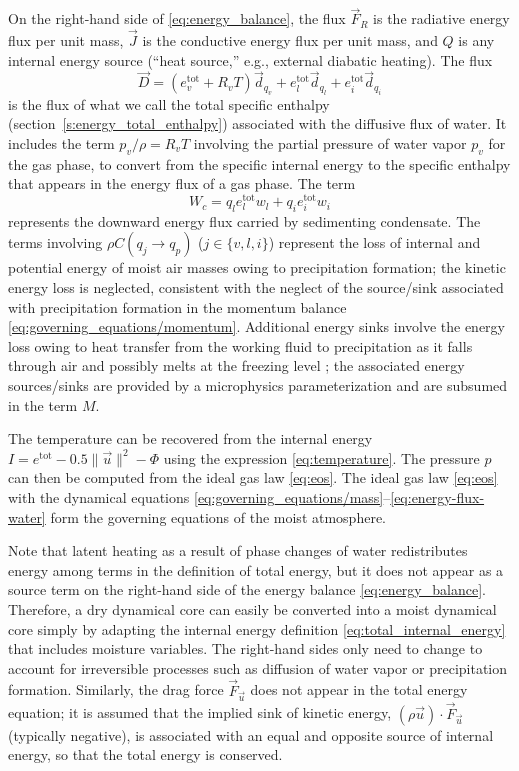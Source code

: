 \documentclass{report}
\begin{document}
On the right-hand side of \eqref{eq:energy_balance}, the flux $\vec{F}_R$ is the radiative energy flux per unit mass, $\vec{J}$ is the conductive energy flux per unit mass, and $Q$ is any internal energy source (``heat source,'' e.g., external diabatic heating). The flux 
\begin{equation}\label{eq:energy-flux-water}
\vec{D} = (e_v^{\mathrm{tot}} + R_v T) \vec{d}_{q_v} + e_l^{\mathrm{tot}} \vec{d}_{q_l} +  e_i^{\mathrm{tot}} \vec{d}_{q_i}
\end{equation}
is the flux of what we call the total specific enthalpy (section~\ref{s:energy_total_enthalpy}) associated with the diffusive flux of water. It includes the term $p_v/\rho = R_v T$ involving the partial pressure of water vapor $p_v$ for the gas phase, to convert from the specific internal energy to the specific enthalpy that appears in the energy flux of a gas phase. The term 
\begin{equation}
W_c = q_l e_l^{\mathrm{tot}} w_l + q_i e_i^{\mathrm{tot}} w_i
\end{equation}
represents the downward energy flux carried by sedimenting condensate. The terms involving $\rho C(q_j \rightarrow q_p)$ ($j \in \{ v, l, i \}$) represent the loss of internal and potential energy of moist air masses owing to precipitation formation; the kinetic energy loss is neglected, consistent with the neglect of the source/sink associated with precipitation formation in the momentum balance \eqref{eq:governing_equations/momentum}. Additional energy sinks involve the energy loss owing to heat transfer from the working fluid to precipitation as it falls through air and possibly melts at the freezing level \citep{Raymond13b}; the associated energy sources/sinks are provided by a microphysics parameterization and are subsumed in the term $M$.

The temperature can be recovered from the internal energy $I = e^{\mathrm{tot}} - 0.5 \| \vec{u} \|^2 - \Phi$ using the expression \eqref{eq:temperature}. The pressure $p$ can then be computed from the ideal gas law \eqref{eq:eos}. The ideal gas law \eqref{eq:eos} with the dynamical equations \eqref{eq:governing_equations/mass}--\eqref{eq:energy-flux-water} form the governing equations of the moist atmosphere.

Note that latent heating as a result of phase changes of water redistributes energy among terms in the definition of total energy, but it does not appear as a source term on the right-hand side of the energy balance \eqref{eq:energy_balance}. Therefore, a dry dynamical core can easily be converted into a moist dynamical core simply by adapting the internal energy definition \eqref{eq:total_internal_energy} that includes moisture variables. The right-hand sides only need to change to account for irreversible processes such as diffusion of water vapor or precipitation formation. Similarly, the drag force $\vec{F}_{\vec{u}}$ does not appear in the total energy equation; it is assumed that the implied sink of kinetic energy, $(\rho \vec{u})\cdot \vec{F}_{\vec{u}}$ (typically negative), is associated with an equal and opposite source of internal energy, so that the total energy is conserved.
\end{document}
